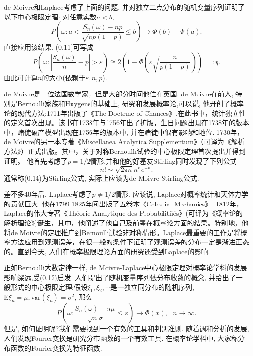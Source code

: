 de Moivre和Laplace考虑了上面的问题, 并对独立二点分布的随机变量序列证明了以下中心极限定理: 对任意实数$a<b$,\begin{equation}
	P\left( \omega:a<\frac{S_n(\omega)-np}{\sqrt{np(1-p)}} \leqslant b  \right) \to \Phi(b)-\Phi(a).
\end{equation}
直接应用该结果, (0.11)可写成\begin{equation}
	P\left( \omega:\left| \frac{S_n(\omega)}{n}-p \right|>\varepsilon \right) \approxeq 2\left( 1-\Phi\left(\varepsilon\sqrt{\frac{n}{p(1-p)}}\right) \right)=: \eta.
\end{equation}
由此可计算$n$的大小(依赖于$\varepsilon,n,p$).

de Moivre是一位法国数学家，但是大部分时间他住在英国. de Moivre在前人, 特别是Bernoulli家族和Huygens的基础上, 研究和发展概率论,可以说, 他开创了概率论的现代方法:1711年出版了《The Doctrine of Chances》.在此书中，统计独立性的定义首次出现。该书在1738年与1756年出了扩版，生日问题出现在1738年的版本中，赌徒破产模型出现在1756年的版本中, 并在赌徒中很有影响和地位.
1730年，de Moivre的另一本专著《Miscellanea Analytica Supplementum》（可译为《解析方法》）正式出版。其中，关于对称Bernoulli试验的中心极限定理首次提出并得到证明。
他首先考虑了$p=1/2$情形,并和他的好基友Stirling同时发现了下列公式\begin{equation}
	n!\sim \sqrt{2\pi n}n^ne^{-n}.
\end{equation}
通常称(0.14)为Stirling公式, 实际上应该为de Moivre-Stirling公式.

差不多40年后, Laplace考虑了$p\neq 1/2$情形. 应该说, Laplace对概率统计和天体力学的贡献巨大. 他在1799-1825年间出版了五卷本《Celestial Mechanics》.
1812年，Laplace的伟大专著《Théorie Analytique des Probabilitiìés》(可译为《概率论的解析理论》)诞生，其中，他阐述了他自己及前辈在概率论方面的结果。特别地，他将de Moivre的定理推广到Bernoulli试验非对称情形。Laplace最重要的工作是将概率方法应用到观测误差，在很一般的条件下证明了观测误差的分布一定是渐进正态的。直到今天, 人们在概率极限理论方面的研究还受到Laplace的影响.

正如Bernoulli大数定律一样, de Moivre-Laplace中心极限定理对概率论学科的发展影响深远,受(0.12)启发, 人们提出了随机变量序列依分布收敛的概念, 并给出了一般形式的中心极限定理:假设$\xi_1,\xi_2,\cdots$是一独立同分布的随机序列,$\mathrm{E}\xi_n = \mu,\mathrm{var}(\xi_n) = \sigma^2$, 那么
\begin{equation}
	P\left( \omega:\frac{S_n(\omega)-n\mu}{\sqrt{n}\sigma}\leqslant x \right) \to \Phi(x),~~~n\to\infty.
\end{equation}
但是, 如何证明呢?我们需要找到一个有效的工具和判别准则. 随着调和分析的发展, 人们发现Fourier变换是研究分布函数的一个有效工具. 在概率论学科中, 大家称分布函数的Fourier变换为特征函数.


